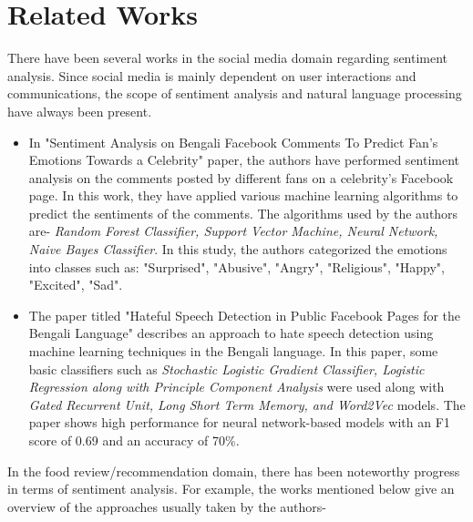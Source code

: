 \chapter{Related Works}\label{related_works}

There have been several works in the social media domain regarding sentiment analysis. Since social media is mainly dependent on user interactions and communications, the scope of sentiment analysis and natural language processing have always been present.

\begin{itemize}
    \item {
        In "Sentiment Analysis on Bengali Facebook Comments To Predict Fan's Emotions Towards a Celebrity"\cite{paper_fans_emotions} paper, the authors have performed sentiment analysis on the comments posted by different fans on a celebrity's Facebook page. In this work, they have applied various machine learning algorithms to predict the sentiments of the comments. The algorithms used by the authors are- \textit{Random Forest Classifier, Support Vector Machine, Neural Network, Naive Bayes Classifier}. In this study, the authors categorized the emotions into classes such as: "Surprised", "Abusive", "Angry", "Religious", "Happy", "Excited", "Sad".
    }
    \item {
        The paper titled "Hateful Speech Detection in Public Facebook Pages for the Bengali Language"\cite{paper_hate_speech} describes an approach to hate speech detection using machine learning techniques in the Bengali language. In this paper, some basic classifiers such as \textit{Stochastic Logistic Gradient Classifier, Logistic Regression along with Principle Component Analysis} were used along with \textit{Gated Recurrent Unit, Long Short Term Memory, and Word2Vec} models. The paper shows high performance for neural network-based models with an F1 score of 0.69 and an accuracy of 70\%.
    }
\end{itemize}

In the food review/recommendation domain, there has been noteworthy progress in terms of sentiment analysis. For example, the works mentioned below give an overview of the approaches usually taken by the authors-

